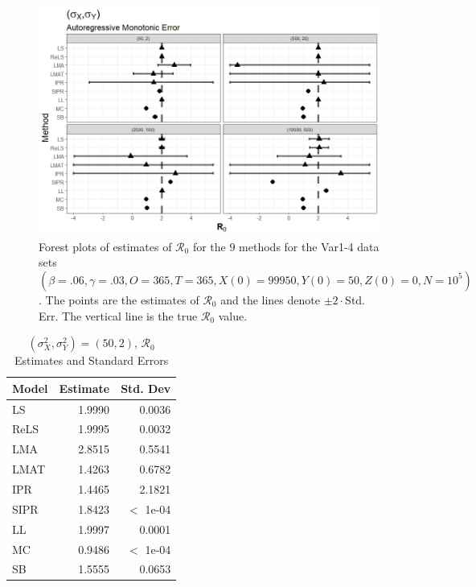 \documentclass[12pt]{article}
\newcommand{\xxsir}{\ensuremath{9} } %
\newcommand{\rr}{\ensuremath{\mathcal{R}_0}}
\begin{document}
\begin{figure}[H]
	\begin{center}
		\includegraphics[scale=0.5]{images/var_arm.jpeg}
		\caption{Forest plots of estimates of $\rr$ for the \xxsir methods for the Var1-4 data sets $(\beta=.06, \gamma=.03, O=365, T=365, X(0)=99950, Y(0)=50, Z(0)=0, N=10^5)$.  The points are the estimates of $\rr$ and the lines denote $\pm 2\cdot $Std. Err.  The vertical line is the true $\rr$ value.}
	\end{center}
\end{figure}

\begin{table}[H]
	
	
	\centering
	\begin{tabular}[t]{l|r|r}
		\hline
		Model & Estimate & Std. Dev\\
		\hline
		LS & 1.9990 & 0.0036\\
		\hline
		ReLS & 1.9995 & 0.0032\\
		\hline
		LMA & 2.8515 & 0.5541\\
		\hline
		LMAT & 1.4263 & 0.6782\\
		\hline
		IPR & 1.4465 & 2.1821\\
		\hline
		SIPR & 1.8423 & $<$ 1e-04\\
		\hline
		LL & 1.9997 & 0.0001\\
		\hline
		MC & 0.9486 & $<$ 1e-04\\
		\hline
		SB & 1.5555 & 0.0653\\
		\hline
	\end{tabular}
	\caption{ $(\sigma^2_X, \sigma^2_Y) = (50, 2)$, $\rr$ Estimates and Standard Errors}
\end{table}
\end{document}
